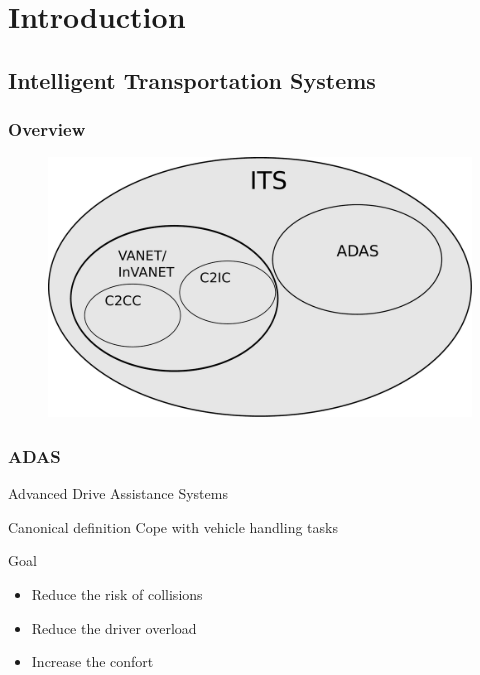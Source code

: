 \documentclass{beamer}
\begin{document}
\section{Introduction}

\subsection{Intelligent Transportation Systems}

	\begin{frame}
		\frametitle{Overview}
	
		\begin{figure}[h]
			\center
			\includegraphics[scale=0.3]{img/fig:its:division}
		 \end{figure}		
		
	\end{frame}

	\begin{frame}
		\frametitle{ADAS}
		
		Advanced Drive Assistance Systems		
		
		\begin{block}{Canonical definition}
			Cope with vehicle handling tasks
		\end{block}		
				
		\begin{block}{Goal}
			\begin{itemize}
			\item Reduce the risk of collisions
			\item Reduce the driver overload
			\item Increase the confort
			\end{itemize}
		\end{block}
		
	\end{frame}
\end{document}
